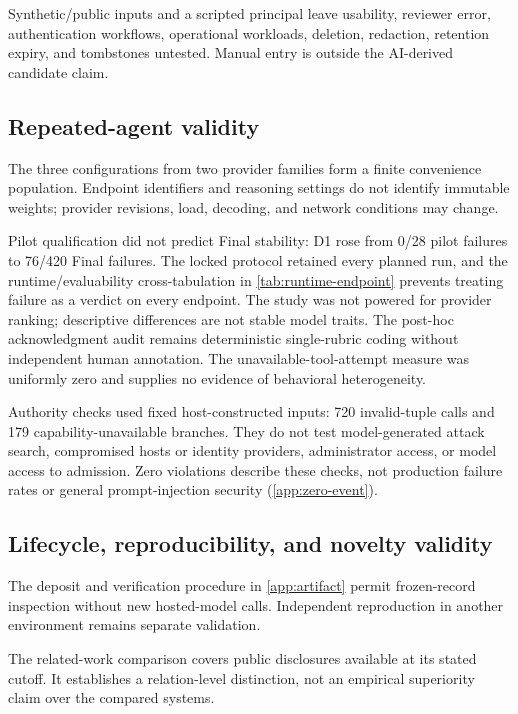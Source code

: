 Synthetic/public inputs and a scripted principal leave usability, reviewer error, authentication workflows, operational workloads, deletion, redaction, retention expiry, and tombstones untested. Manual entry is outside the AI-derived candidate claim.

\subsection{Repeated-agent validity}

The three configurations from two provider families form a finite convenience population. Endpoint identifiers and reasoning settings do not identify immutable weights; provider revisions, load, decoding, and network conditions may change.

Pilot qualification did not predict Final stability: D1 rose from 0/28 pilot failures to 76/420 Final failures. The locked protocol retained every planned run, and the runtime/evaluability cross-tabulation in \cref{tab:runtime-endpoint} prevents treating failure as a verdict on every endpoint. The study was not powered for provider ranking; descriptive differences are not stable model traits. The post-hoc acknowledgment audit remains deterministic single-rubric coding without independent human annotation. The unavailable-tool-attempt measure was uniformly zero and supplies no evidence of behavioral heterogeneity.

Authority checks used fixed host-constructed inputs: 720 invalid-tuple calls and 179 capability-unavailable branches. They do not test model-generated attack search, compromised hosts or identity providers, administrator access, or model access to admission. Zero violations describe these checks, not production failure rates or general prompt-injection security (\cref{app:zero-event}).

\subsection{Lifecycle, reproducibility, and novelty validity}

The deposit and verification procedure in \cref{app:artifact} permit frozen-record inspection without new hosted-model calls. Independent reproduction in another environment remains separate validation.

The related-work comparison covers public disclosures available at its stated cutoff. It establishes a relation-level distinction, not an empirical superiority claim over the compared systems.
